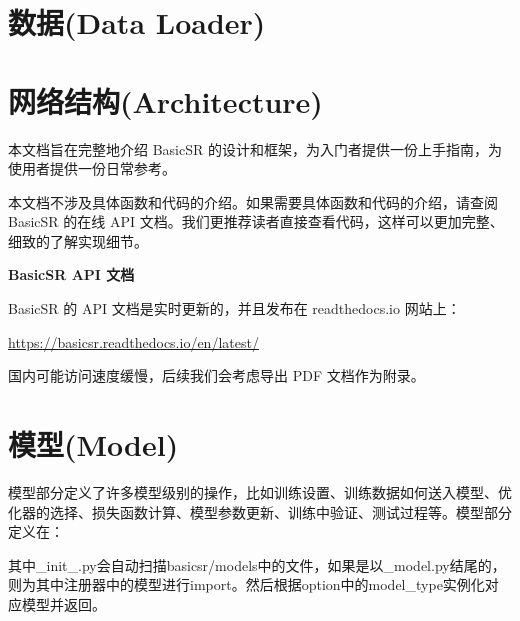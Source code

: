 \documentclass[../main.tex]{subfiles}
\begin{document}


\section{数据(Data Loader)}

\section{网络结构(Architecture)}


本文档旨在完整地介绍 BasicSR 的设计和框架，为入门者提供一份上手指南，为使用者提供一份日常参考。

本文档不涉及具体函数和代码的介绍。如果需要具体函数和代码的介绍，请查阅 BasicSR 的在线 API 文档。我们更推荐读者直接查看代码，这样可以更加完整、细致的了解实现细节。

\begin{hl} %
	\textbf{BasicSR API 文档}

	BasicSR 的 API 文档是实时更新的，并且发布在 readthedocs.io 网站上：

	\url{https://basicsr.readthedocs.io/en/latest/}

	国内可能访问速度缓慢，后续我们会考虑导出 PDF 文档作为附录。
\end{hl}

\section{模型(Model)}

模型部分定义了许多模型级别的操作，比如训练设置、训练数据如何送入模型、优化器的选择、损失函数计算、模型参数更新、训练中验证、测试过程等。模型部分定义在：

其中\_init\_.py会自动扫描basicsr/models中的文件，如果是以\_model.py结尾的，则为其中注册器中的模型进行import。然后根据option中的model\_type实例化对应模型并返回。
\end{document}

